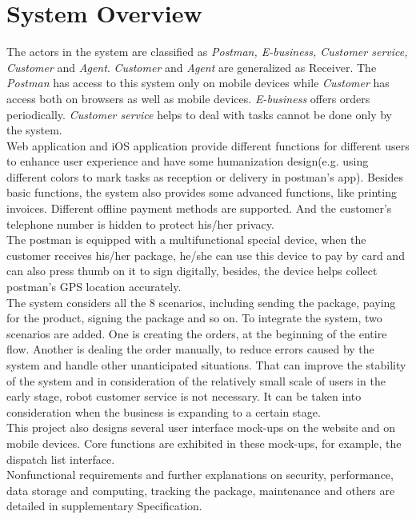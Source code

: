 \documentclass[12pt]{scrreprt}
\begin{document}
\section{System Overview}
The actors in the system are classified as \emph{Postman, E-business, Customer
service, Customer} and \emph{Agent}. \emph{Customer} and \emph{Agent} are
generalized as Receiver. The \emph{Postman} has access to this system
only on mobile devices while \emph{Customer} has access both on browsers
as well as mobile devices. \emph{E-business} offers orders periodically.
\emph{Customer service} helps to deal with tasks cannot be done only by
the system.\\
Web application and iOS application provide different functions for different
users to enhance user experience and have some humanization design(e.g.
using different colors to mark tasks as reception or delivery in postman’s app).
Besides basic functions, the system also provides some advanced functions,
like printing invoices. Different offline payment methods are supported.
And the customer’s telephone number is hidden to protect his/her privacy.\\
The postman is equipped with a multifunctional special device, when the
customer receives his/her package, he/she can use this device to pay by
card and can also press thumb on it to sign digitally, besides, the device
helps collect postman’s GPS location accurately.\\
The system considers all the 8 scenarios, including sending the package,
paying for the product, signing the package and so on. To integrate the
system, two scenarios are added. One is creating the orders, at the beginning
of the entire flow. Another is dealing the order manually, to reduce errors
caused by the system and handle other unanticipated situations. That can
improve the stability of the system and in consideration of the relatively
small scale of users in the early stage, robot customer service is not
necessary. It can be taken into consideration when the business is expanding
to a certain stage.\\
This project also designs several user interface mock-ups on the website
and on mobile devices. Core functions are exhibited in these mock-ups,
for example, the dispatch list interface.\\
Nonfunctional requirements and further explanations on security, performance,
data storage and computing, tracking the package, maintenance and others are
detailed in supplementary Specification.
\end{document}
